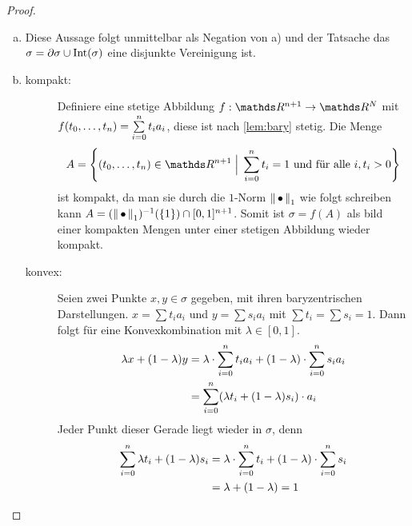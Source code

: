 \begin{Satz}
\begin{proof}
\begin{enumerate}[a):]
    \item Diese Aussage folgt unmittelbar als Negation von a) und der
      Tatsache das $\sigma = \partial\sigma \cup \Int(\sigma)$ eine
      disjunkte Vereinigung ist.
    \item \begin{description}
      \item[kompakt:] Definiere eine stetige Abbildung
        $f : \R^{n+1} \rightarrow \R^N$ mit
        $ f(t_0,\ldots ,t_n) = \sp{0}{n} t_i a_i$, diese ist nach
        \cref{lem:bary} stetig. Die Menge
        \begin{gather*}
          A= \set{ (t_0,\ldots,t_n) \in \R^{n+1}}{ \sp{0}{n} t_i = 1
            \text{ und für alle } i , t_i > 0}
        \end{gather*}
        ist kompakt, da man sie durch die $1$-Norm $\nn_1$ wie folgt
        schreiben kann $A = (\nn_1)^{-1}(\{ 1 \}) \cap
        [0,1]^{n+1}$.
        Somit ist $\sigma = f(A)$ als bild einer kompakten Mengen
        unter einer stetigen Abbildung wieder kompakt.
      \item[konvex:] Seien zwei Punkte $x,y \in \sigma$ gegeben,
        mit ihren baryzentrischen Darstellungen. $x = \sum t_i a_i$
        und $y = \sum s_i a_i$ mit $\sum t_i = \sum s_i = 1$. Dann
        folgt für eine Konvexkombination mit $\lambda \in [0,1]$.
        \begin{align}
          \lambda x + (1- \lambda)y &= \lambda \cdot \sp{0}{n} t_i a_i%
                                      + (1-\lambda) \cdot \sp{0}{n} s_i a_i \\
                                    &= \sp{0}{n} (\lambda t_i +%
                                      (1-\lambda) s_i) \cdot a_i 
        \end{align}
        Jeder Punkt dieser Gerade liegt wieder in $\sigma$, denn 
        \begin{align*}
          \sp{0}{n} \lambda t_i + (1-\lambda) s_i 
          &= \lambda \cdot \sp{0}{n} t_i + (1-\lambda) \cdot \sp{0}{n} s_i \\
          &= \lambda + (1 - \lambda) = 1
        \end{align*}

\end{description}
\end{enumerate}
\end{proof}
\end{Satz}
